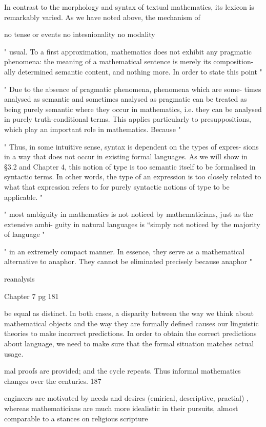 In contrast to the morphology and syntax of textual mathematics, its
lexicon is remarkably varied. As we have noted above, the mechanism of

no tense or events
no intesnionality
no modality

"
usual. To a first approximation, mathematics does not exhibit any pragmatic
phenomena: the meaning of a mathematical sentence is merely its composition-
ally determined semantic content, and nothing more. In order to state this point
"


"
Due to the absence of pragmatic phenomena, phenomena which are some-
times analysed as semantic and sometimes analysed as pragmatic can be
treated as being purely semantic where they occur in mathematics, i.e. they
can be analysed in purely truth-conditional terms. This applies particularly
to presuppositions, which play an important role in mathematics. Because
"

"
Thus, in some intuitive sense, syntax is dependent on the types of expres-
sions in a way that does not occur in existing formal languages. As we will
show in §3.2 and Chapter 4, this notion of type is too semantic itself to be
formalised in syntactic terms. In other words, the type of an expression is too
closely related to what that expression refers to for purely syntactic notions
of type to be applicable.
"

"
most ambiguity in mathematics is not noticed by mathematicians, just as the extensive ambi-
guity in natural languages is “simply not noticed by the majority of language
"

"
in an extremely compact manner. In essence, they serve as a mathematical
alternative to anaphor. They cannot be eliminated precisely because anaphor
"

reanalysis

Chapter 7 pg 181

be equal as distinct. In both cases, a disparity between the way we think
about mathematical objects and the way they are formally defined causes
our linguistic theories to make incorrect predictions. In order to obtain the
correct predictions about language, we need to make sure that the formal
situation matches actual usage.

mal proofs are provided; and the cycle repeats. Thus informal mathematics
changes over the centuries. 187

engineers are motivated by needs and desires (emirical, descriptive,
practial) , whereas mathematicians are much more idealistic in their pursuits,
almost comparable to a stances on religious scripture

